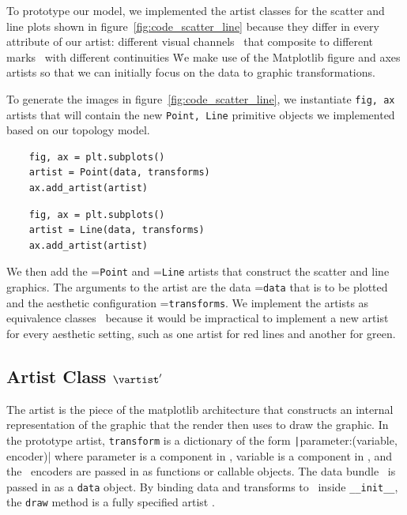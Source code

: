 \documentclass[../main.tex]{subfiles}
\begin{document}
To prototype our model, we implemented the artist classes for the scatter and line plots shown in figure~\ref{fig:code_scatter_line} because they differ in every attribute of our artist: different visual channels \vchannel\ that composite to different marks \vmark\ with different continuities \vindex\.  We make use of the Matplotlib figure and axes artists \cite{hunterArchitectureOpenSource,hunterMatplotlib2DGraphics2007} so that we can initially focus on the data to graphic transformations. 

To generate the images in figure~\ref{fig:code_scatter_line}, we instantiate \texttt{fig, ax} artists that will contain the new \texttt{Point, Line} primitive objects we implemented based on our topology model. 

\begin{multicols*}{2}
\begin{verbatim}
    fig, ax = plt.subplots()
    artist = Point(data, transforms)
    ax.add_artist(artist)
\end{verbatim}
\columnbreak
\begin{verbatim}
    fig, ax = plt.subplots()
    artist = Line(data, transforms)
    ax.add_artist(artist)
\end{verbatim}
\end{multicols*}

We then add the \vartisteq=\texttt{Point} and  \vartisteq=\texttt{Line} artists that construct the scatter and line graphics. The arguments to the artist are the data \dtotal=\texttt{data} that is to be plotted and the aesthetic configuration \vchannel=\texttt{transforms}. We implement the artists as equivalence classes \vartisteq\ because it would be impractical to implement a new artist for every aesthetic setting, such as one artist for red lines and another for green.
 
\subsection{Artist Class $\vartist^{\prime}$}
The artist is the piece of the matplotlib architecture that constructs an internal representation of the graphic that the render then uses to draw the graphic. In the prototype artist, \texttt{transform} is a dictionary of the form \texttt|{parameter:(variable, encoder)}| where parameter is a component in \vfiber, variable is a component in \dfiber,  and the \vchannel\ encoders are passed in as functions or callable objects. The data bundle \dtotal\ is passed in as a \texttt{data} object. By binding data and transforms to \vartisteq\ inside \texttt{__init__}, the \texttt{draw} method is a fully specified artist \vartist.
\end{document}
